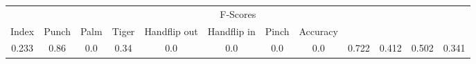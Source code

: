 \documentclass{standalone}
\begin{document}
 
 \begin{tabular}{|c|c|c|c|c|c|c|c|c|c|c ||c|}
\cline{1-12}\multicolumn{12}{|c|}{F-Scores} \\ 
\cline{1-12}Index & Punch & Palm & Tiger & Handflip out & Handflip in & Pinch & Accuracy\\ 
\cline{1-12}0.233 & 0.86 & 0.0 & 0.34 & 0.0 & 0.0 & 0.0 & 0.0 & 0.722 & 0.412 & 0.502 & 0.341\\ 
 \cline{1-12}\hline \end{tabular}
 
\end{document}
